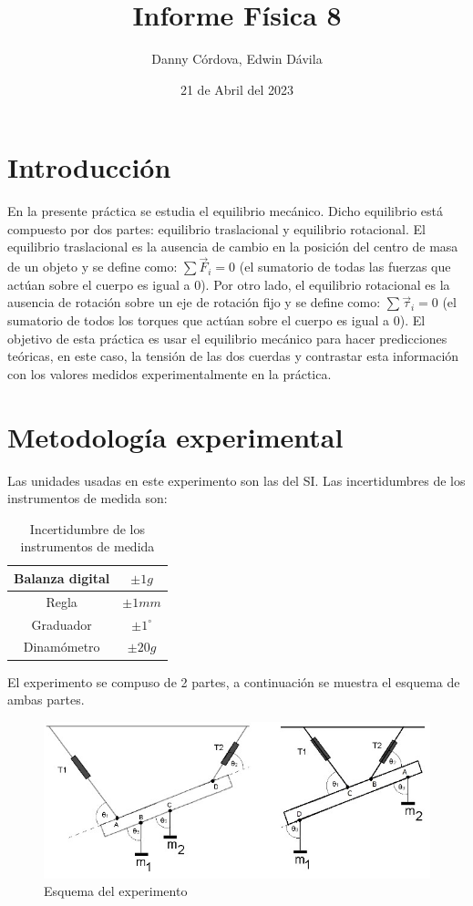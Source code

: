 \documentclass[a4paper]{article}
\title{Informe Física 8}
\author{Danny Córdova, Edwin Dávila}
\date{21 de Abril del 2023}
\begin{document}
\maketitle

\section{Introducción}

En la presente práctica se estudia el equilibrio mecánico. Dicho equilibrio está compuesto por dos partes: equilibrio traslacional y equilibrio rotacional. El equilibrio traslacional es la ausencia de cambio en la posición del centro de masa de un objeto y se define como: $\sum \Vec{F}_i=0$ (el sumatorio de todas las fuerzas que actúan sobre el cuerpo es igual a 0). Por otro lado, el equilibrio rotacional es la ausencia de rotación sobre un eje de rotación fijo y se define como: $\sum \Vec{\tau}_i=0$ (el sumatorio de todos los torques que actúan sobre el cuerpo es igual a 0). El objetivo de esta práctica es usar el equilibrio mecánico para hacer predicciones teóricas, en este caso, la tensión de las dos cuerdas y contrastar esta información con los valores medidos experimentalmente en la práctica.


\section{Metodología experimental}

Las unidades usadas en este experimento son las del SI. Las incertidumbres de los instrumentos de medida son:

\begin{table}[H]
    \centering
    \begin{tabular}{|c|c|}
    \hline
        Balanza digital & $\pm1 g$ \\ \hline
        Regla  & $\pm 1 mm$ \\ \hline
        Graduador  & $\pm 1^\circ$ \\ \hline
        Dinamómetro & $\pm 20 g$ \\ \hline
    \end{tabular}
    \caption{Incertidumbre de los instrumentos de medida}
    \label{Incertidumbre de los instrumentos de medida}
\end{table}

El experimento se compuso de 2 partes, a continuación se muestra el esquema de ambas partes.

\begin{figure}[H]
    \centering
    \includegraphics{Esquema exp 8.jpg}
    \caption{Esquema del experimento}
    \label{Esquema}
\end{figure}
\end{document}

